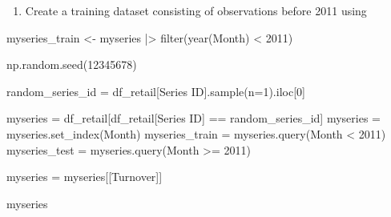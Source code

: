 \documentclass[
  11pt,
]{article}
\newenvironment{Shaded}{\begin{snugshade}}{\end{snugshade}}
\newcommand{\DecValTok}[1]{\textcolor[rgb]{0.68,0.00,0.00}{#1}}
\newcommand{\NormalTok}[1]{\textcolor[rgb]{0.00,0.23,0.31}{#1}}
\newcommand{\OperatorTok}[1]{\textcolor[rgb]{0.37,0.37,0.37}{#1}}
\newcommand{\StringTok}[1]{\textcolor[rgb]{0.13,0.47,0.30}{#1}}
\providecommand{\tightlist}{%
  \setlength{\itemsep}{0pt}\setlength{\parskip}{0pt}}\usepackage{longtable,booktabs,array}
\begin{document}
\begin{enumerate}
\def\labelenumi{\alph{enumi}.}
\tightlist
\item
  Create a training dataset consisting of observations before 2011 using
\end{enumerate}

\begin{Shaded}
\begin{Highlighting}[]
\NormalTok{myseries\_train \textless{}{-} myseries |\textgreater{}}
\NormalTok{  filter(year(Month) \textless{} 2011)}
\end{Highlighting}
\end{Shaded}

\begin{Shaded}
\begin{Highlighting}[]
\NormalTok{np.random.seed(}\DecValTok{12345678}\NormalTok{)}

\NormalTok{random\_series\_id }\OperatorTok{=}\NormalTok{ df\_retail[}\StringTok{\textquotesingle{}Series ID\textquotesingle{}}\NormalTok{].sample(n}\OperatorTok{=}\DecValTok{1}\NormalTok{).iloc[}\DecValTok{0}\NormalTok{]}

\NormalTok{myseries }\OperatorTok{=}\NormalTok{ df\_retail[df\_retail[}\StringTok{\textquotesingle{}Series ID\textquotesingle{}}\NormalTok{] }\OperatorTok{==}\NormalTok{ random\_series\_id]}
\NormalTok{myseries }\OperatorTok{=}\NormalTok{ myseries.set\_index(}\StringTok{\textquotesingle{}Month\textquotesingle{}}\NormalTok{)}
\NormalTok{myseries\_train }\OperatorTok{=}\NormalTok{ myseries.query(}\StringTok{\textquotesingle{}Month \textless{} 2011\textquotesingle{}}\NormalTok{)}
\NormalTok{myseries\_test }\OperatorTok{=}\NormalTok{ myseries.query(}\StringTok{\textquotesingle{}Month \textgreater{}= 2011\textquotesingle{}}\NormalTok{)}
\end{Highlighting}
\end{Shaded}

\begin{Shaded}
\begin{Highlighting}[]
\NormalTok{myseries }\OperatorTok{=}\NormalTok{ myseries[[}\StringTok{\textquotesingle{}Turnover\textquotesingle{}}\NormalTok{]]}
\end{Highlighting}
\end{Shaded}

\begin{Shaded}
\begin{Highlighting}[]
\NormalTok{myseries}
\end{Highlighting}
\end{Shaded}
\end{document}
